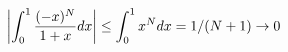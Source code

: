 \documentclass[preview]{standalone}
\begin{document}
\begin{align*}
\special{dvisvgm:raw <g id='unique000'>}\left|\int_0^1\frac{(-x)^N}{1+x}dx\right|\le\int_0^1x^Ndx=1/(N+1)\to0\special{dvisvgm:raw </g>}
\end{align*}
\end{document}
